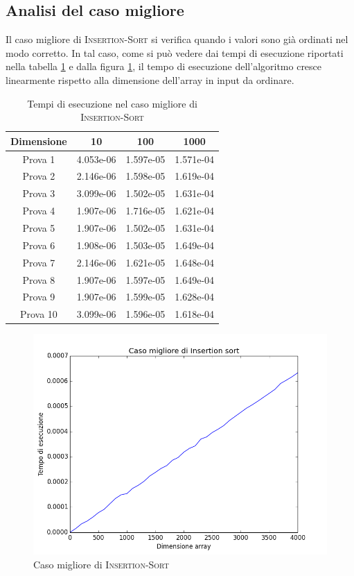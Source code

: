 \documentclass[11pt]{article}
\begin{document}
\subsection{Analisi del caso migliore}
Il caso migliore di \textsc{Insertion-Sort} si verifica quando i valori sono già ordinati nel modo corretto. In tal caso, come si può vedere dai tempi di esecuzione riportati nella tabella \ref{t_migliore_insertion} e dalla figura \ref{migliore_insertion}, il tempo di esecuzione dell'algoritmo cresce linearmente rispetto alla dimensione dell'array in input da ordinare.
\begin{table}[h]
\centering
\begin{tabular}{|c|c|c|c|}\hline
Dimensione &10 &100 &1000\\ \hline
Prova 1	&4.053e-06	&1.597e-05 &1.571e-04 \\ \hline
Prova 2	&2.146e-06	&1.598e-05	&1.619e-04 \\ \hline
Prova 3	&3.099e-06	&1.502e-05	&1.631e-04 \\ \hline
Prova 4	&1.907e-06	&1.716e-05	&1.621e-04 \\ \hline
Prova 5	&1.907e-06	&1.502e-05	&1.631e-04 \\ \hline
Prova 6	&1.908e-06	&1.503e-05	&1.649e-04  \\ \hline
Prova 7	&2.146e-06	&1.621e-05	&1.648e-04  \\ \hline
Prova 8	&1.907e-06	&1.597e-05	&1.649e-04 \\ \hline
Prova 9	&1.907e-06	&1.599e-05	&1.628e-04 \\ \hline
Prova 10&3.099e-06	&1.596e-05 &1.618e-04 \\ \hline
\end{tabular}
\caption{Tempi di esecuzione nel caso migliore di \textsc{Insertion-Sort}}
\label{t_migliore_insertion}
\end{table}
\begin{figure}[h]
\centering
\includegraphics[scale=0.33,angle=0]{migliore_insertion.png}
\caption{Caso migliore di \textsc{Insertion-Sort}}
\label{migliore_insertion}
\end{figure}
\end{document}
